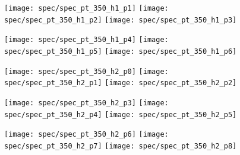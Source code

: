 \begin{figure}[!ht]
  \centering

  \texttt{[image: spec/spec\_pt\_350\_h1\_p1]}
  \texttt{[image: spec/spec\_pt\_350\_h1\_p2]}
  \texttt{[image: spec/spec\_pt\_350\_h1\_p3]}

  \texttt{[image: spec/spec\_pt\_350\_h1\_p4]}
  \texttt{[image: spec/spec\_pt\_350\_h1\_p5]}
  \texttt{[image: spec/spec\_pt\_350\_h1\_p6]}

  \caption{}
  \label{fig:hadron:spec:vzero:all350:h1}
\end{figure}


\begin{figure}[!ht]
  \centering

  \texttt{[image: spec/spec\_pt\_350\_h2\_p0]}
  \texttt{[image: spec/spec\_pt\_350\_h2\_p1]}
  \texttt{[image: spec/spec\_pt\_350\_h2\_p2]}
  
  \texttt{[image: spec/spec\_pt\_350\_h2\_p3]}
  \texttt{[image: spec/spec\_pt\_350\_h2\_p4]}
  \texttt{[image: spec/spec\_pt\_350\_h2\_p5]}

  \texttt{[image: spec/spec\_pt\_350\_h2\_p6]}
  \texttt{[image: spec/spec\_pt\_350\_h2\_p7]}
  \texttt{[image: spec/spec\_pt\_350\_h2\_p8]}

  \caption{}
  \label{fig:hadron:spec:vzero:all350:h2}
\end{figure}
